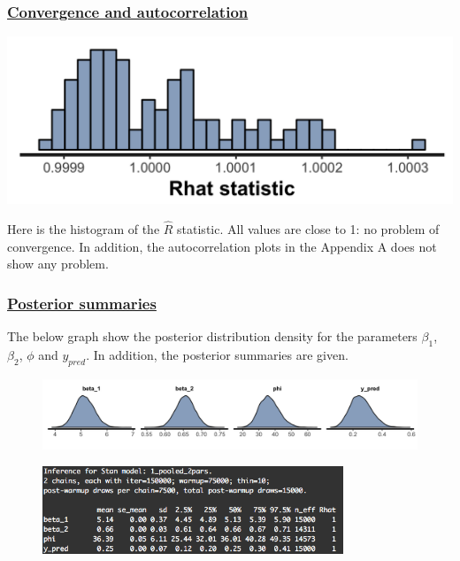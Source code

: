 \documentclass{article}
\begin{document}
\subsubsection*{\underline{Convergence and autocorrelation}}
\begin{minipage}{0.50\textwidth}
\includegraphics[width=\linewidth]{pooled_2pars_rhat.png}
\end{minipage}
\begin{minipage}{0.50\textwidth}
Here is the histogram of the $\widehat{R}$ statistic. All values are close to 1: no problem of convergence. In addition, the autocorrelation plots in the Appendix A does not show any problem.
\end{minipage}


\subsubsection*{\underline{Posterior summaries}}
The below graph show the posterior distribution density for the parameters $\beta_1$, $\beta_2$, $\phi$ and $y_{pred}$. In addition, the posterior summaries are given.

\begin{figure}[ht!]
\centering
\includegraphics[width=13cm]{pooled_2pars_dens.png}
\end{figure}

\begin{figure}[ht!]
\centering
\includegraphics[width=9cm]{p01.png}
\end{figure}
\end{document}
